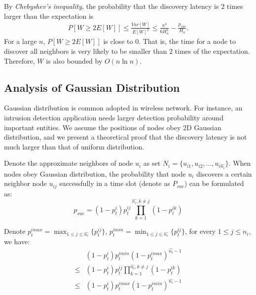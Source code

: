 By \emph{Chebyshev's inequality}, the probability that the discovery latency is $2$ times larger than the expectation is
\begin{displaymath}
\begin{split}
P[W\ge2E[W]]%
\le\frac{Var[W]}{E[W]^2}
\le\frac{\pi^2}{6H_{n}^2}-\frac{p_{suc}}{H_n}.
\end{split}
\end{displaymath}
For a large $n$, $P[W\ge2E[W]]$ is close to $0$. That is, the time for a node to discover all neighbors is very likely to be smaller than $2$ times of the expectation. Therefore, $W$ is also bounded by $O(n\ln n)$.












\subsection{Analysis of Gaussian Distribution}
\label{normal}
Gaussian distribution is common adopted in wireless network. For instance, an intrusion detection application needs larger detection
probability around important entities\cite{wang2013gaussian}. We assume the positions of nodes obey 2D Gaussian distribution, and we present a theoretical proof that the discovery latency is not much larger than that of uniform distribution. 

Denote the approximate neighbors of node $u_i$ as set $N_i = \{u_{i1},u_{i2},...,u_{i\hat{n_i}}\}$. When nodes obey Gaussian distribution, the probability that node $u_i$ discovers a certain neighbor node $u_{ij}$ successfully in a time slot (denote as $P_{suc}$) can be formulated as:
$$
p_{suc} = (1-p_t^i)p_t^{ij}\prod_{ k=1}^{\hat{n_i}, k\neq j}(1-p_t^{ik})
$$

Denote $p_t^{imax} = \max_{1 \leq j \leq \hat{n_i}}\{p_t^{ij}\}$, $p_t^{imin} = \min_{1 \leq j \leq \hat{n_i}}\{p_t^{ij}\}$, for every $1 \leq j \leq n_i$, we have:
\begin{align*}
&(1-p_t^i)p_t^{imin}{(1-p_t^{imax})}^{\hat{n_i}-1} \\
\leq &(1-p_t^i)p_t^{ij}\prod_{ k=1}^{\hat{n_i}, k\neq j}(1-p_t^{ik}) \\
\leq &(1-p_t^i)p_t^{imax}{(1-p_t^{imin})}^{\hat{n_i}-1}
\end{align*}

